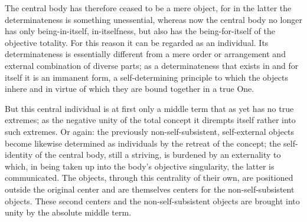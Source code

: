 The central body has therefore ceased to be a mere object,
for in the latter the determinateness is something unessential,
whereas now the central body no longer
has only being-in-itself, in-itselfness,
but also has the being-for-itself
of the objective totality.
For this reason it can be regarded as an individual.
Its determinateness is essentially different
from a mere order or arrangement
and external combination of diverse parts;
as a determinateness that exists
in and for itself it is an immanent form,
a self-determining principle to which the objects inhere
and in virtue of which they are bound together in a true One.

But this central individual is at first only
a middle term that as yet has no true extremes;
as the negative unity of the total concept
it dirempts itself rather into such extremes.
Or again: the previously non-self-subsistent,
self-external objects become likewise determined as
individuals by the retreat of the concept;
the self-identity of the central body, still a striving,
is burdened by an externality
to which, in being taken up into
the body's objective singularity,
the latter is communicated.
The objects, through this centrality of their own,
are positioned outside the original center
and are themselves centers for the non-self-subsistent objects.
These second centers and the non-self-subsistent objects are
brought into unity by the absolute middle term.

